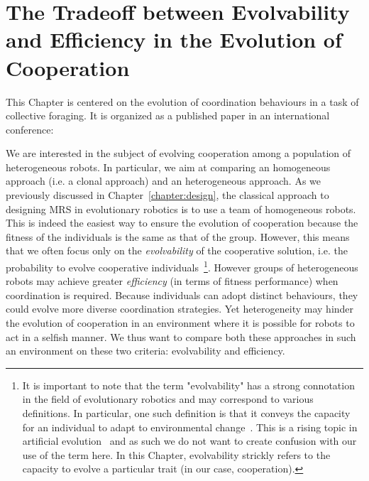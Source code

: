 \chapter{The Tradeoff between Evolvability and Efficiency in the Evolution of Cooperation}
\label{chapter:C2_article1}

\setcounter{secnumdepth}{0}
\setcounter{minitocdepth}{1}
\minitoc[n] %

This Chapter is centered on the evolution of coordination behaviours in a task of collective foraging. It is organized as a published paper in an international conference:

\begin{quote}
\end{quote}


We are interested in the subject of evolving cooperation among a population of heterogeneous robots. In particular, we aim at comparing an homogeneous approach (i.e. a clonal approach) and an heterogeneous approach. As we previously discussed in Chapter~\ref{chapter:design}, the classical approach to designing MRS in evolutionary robotics is to use a team of homogeneous robots. This is indeed the easiest way to ensure the evolution of cooperation because the fitness of the individuals is the same as that of the group. However, this means that we often focus only on the \emph{evolvability} of the cooperative solution, i.e. the probability to evolve cooperative individuals~\footnote{It is important to note that the term "evolvability" has a strong connotation in the field of evolutionary robotics and may correspond to various definitions. In particular, one such definition is that it conveys the capacity for an individual to adapt to environmental change~\parencite{Wagner1996}. This is a rising topic in artificial evolution~\parencite{Banzhaf2006, Lehman2013, Doncieux2015a, Taylor2016} and as such we do not want to create confusion with our use of the term here. In this Chapter, evolvability strickly refers to the capacity to evolve a particular trait (in our case, cooperation).}. However groups of heterogeneous robots may achieve greater \emph{efficiency} (in terms of fitness performance) when coordination is required. Because individuals can adopt distinct behaviours, they could evolve more diverse coordination strategies. Yet heterogeneity may hinder the evolution of cooperation in an environment where it is possible for robots to act in a selfish manner. We thus want to compare both these approaches in such an environment on these two criteria: evolvability and efficiency.

